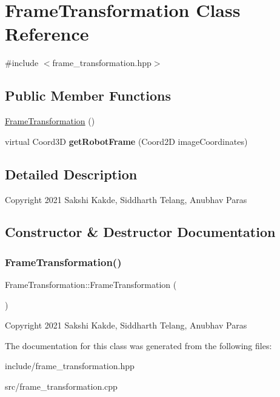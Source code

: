 \hypertarget{classFrameTransformation}{}\section{Frame\+Transformation Class Reference}
\label{classFrameTransformation}


{\ttfamily \#include $<$frame\+\_\+transformation.\+hpp$>$}

\subsection*{Public Member Functions}
\begin{DoxyCompactItemize}
\item 
\hyperlink{classFrameTransformation_aa4495bbd8e06ac1d793063c7a0aa0c03}{Frame\+Transformation} ()
\item 
\mbox{\label{classFrameTransformation_ab5131e1392b2fb97c65014eec96d54a8}} 
virtual Coord3D {\bfseries get\+Robot\+Frame} (Coord2D image\+Coordinates)
\end{DoxyCompactItemize}


\subsection{Detailed Description}
Copyright 2021 Sakshi Kakde, Siddharth Telang, Anubhav Paras 

\subsection{Constructor \& Destructor Documentation}
\mbox{\label{classFrameTransformation_aa4495bbd8e06ac1d793063c7a0aa0c03}} 
\subsubsection{\texorpdfstring{Frame\+Transformation()}{FrameTransformation()}}
{\footnotesize\ttfamily Frame\+Transformation\+::\+Frame\+Transformation (\begin{DoxyParamCaption}{ }\end{DoxyParamCaption})}

Copyright 2021 Sakshi Kakde, Siddharth Telang, Anubhav Paras 

The documentation for this class was generated from the following files\+:\begin{DoxyCompactItemize}
\item 
include/frame\+\_\+transformation.\+hpp\item 
src/frame\+\_\+transformation.\+cpp\end{DoxyCompactItemize}
